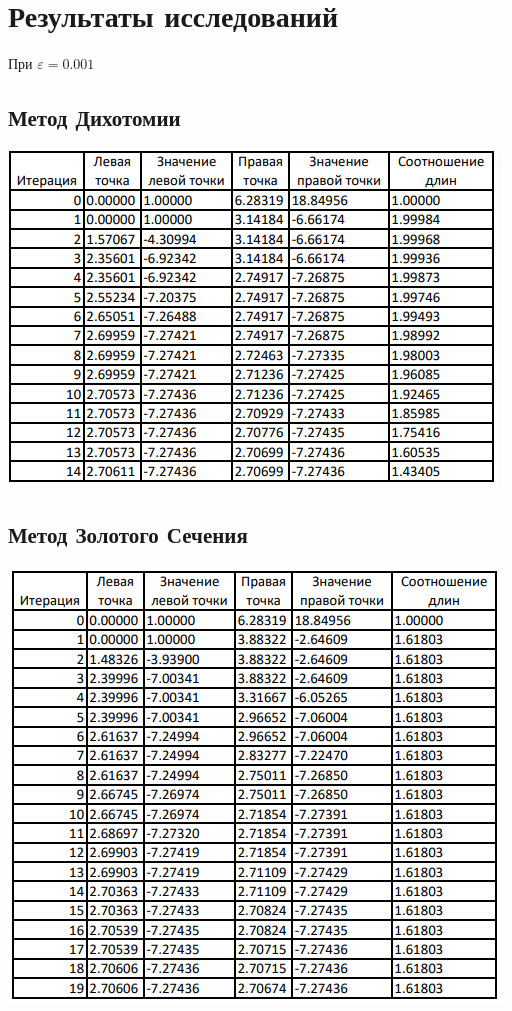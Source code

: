 \documentclass[a4paper,12pt]{article}
\begin{document}
\section{Результаты исследований}
При $\varepsilon=0.001$

\subsection{Метод Дихотомии}
\includegraphics[width=\linewidth]{table_dichotomy.PNG}
\clearpage

\subsection{Метод Золотого Сечения}
\includegraphics[width=\linewidth]{table_golden_ratio.PNG}
\clearpage
\end{document}
